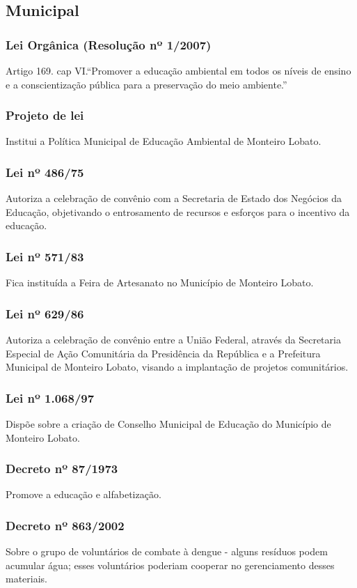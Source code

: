 \begin{subapend}
	\subsection{Municipal}
	\begin{subsubapend}
		\item \subsubsection{Lei Orgânica (Resolução nº 1/2007)}
		Artigo 169. cap VI.“Promover a educação ambiental em todos os níveis de ensino e a conscientização pública para a preservação do meio ambiente.”
		\subsubsection{Projeto de lei}
		Institui a Política Municipal de Educação Ambiental de Monteiro Lobato.
		\subsubsection{Lei nº 486/75}
		Autoriza a celebração de convênio com a Secretaria de Estado dos Negócios da Educação, objetivando o entrosamento de recursos e esforços para o incentivo da educação.
		\subsubsection{Lei nº 571/83}
		Fica instituída a Feira de Artesanato no Município de Monteiro Lobato.
		\subsubsection{Lei nº 629/86}
		Autoriza a celebração de convênio entre a União Federal, através da Secretaria Especial de Ação Comunitária da Presidência da República e a Prefeitura Municipal de Monteiro Lobato, visando a implantação de projetos comunitários.
		\subsubsection{Lei nº 1.068/97}
		Dispõe sobre a criação de Conselho Municipal de Educação do Município de Monteiro Lobato.
		\subsubsection{Decreto nº 87/1973}
		Promove a educação e alfabetização.
		\subsubsection{Decreto nº 863/2002}
		Sobre o grupo de voluntários de combate à dengue - alguns resíduos podem acumular água; esses voluntários poderiam cooperar no gerenciamento desses materiais.
	\end{subsubapend}
\end{subapend}

